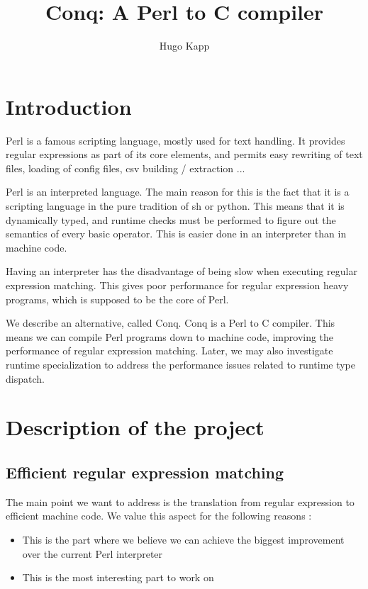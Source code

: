 \documentclass[11pt,a4paper]{report}
\title{Conq: A Perl to C compiler}
\author{Hugo Kapp}
\newcommand{\pgl}[1]{\textsf{#1}}
\begin{document}
\maketitle


\tableofcontents

\chapter*{Introduction}

Perl is a famous scripting language, mostly used for text handling. It provides regular expressions as part of its core elements, and permits easy rewriting of text files, loading of config files, csv building / extraction ...

Perl is an interpreted language. The main reason for this is the fact that it is a scripting language in the pure tradition of \pgl{sh} or \pgl{python}. This means that it is dynamically typed, and runtime checks must be performed to figure out the semantics of every basic operator. This is easier done in an interpreter than in machine code.

Having an interpreter has the disadvantage of being slow when executing regular expression matching. This gives poor performance for regular expression heavy programs, which is supposed to be the core of Perl.


We describe an alternative, called Conq. Conq is a Perl to C compiler. This means we can compile Perl programs down to machine code, improving the performance of regular expression matching. Later, we may also investigate runtime specialization to address the performance issues related to runtime type dispatch.

\chapter{Description of the project}

\section{Efficient regular expression matching}

The main point we want to address is the translation from regular expression to efficient machine code. We value this aspect for the following reasons :
\begin{itemize}
\item This is the part where we believe we can achieve the biggest improvement over the current Perl interpreter
\item This is the most interesting part to work on
\end{itemize}
\end{document}
